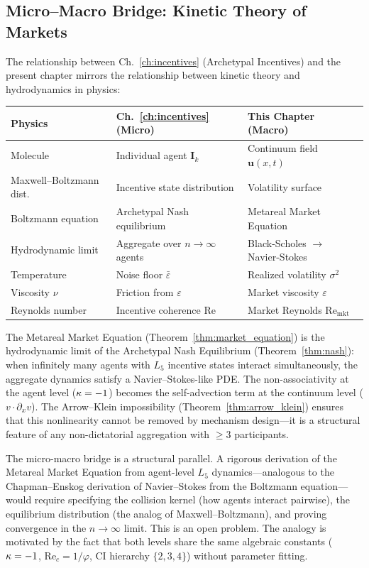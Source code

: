\subsection{Micro--Macro Bridge: Kinetic Theory of Markets}

The relationship between Ch.~\ref{ch:incentives} (Archetypal Incentives) and the present chapter mirrors the relationship between kinetic theory and hydrodynamics in physics:

\begin{center}
\begin{tabular}{@{}lll@{}}
\toprule
\textbf{Physics} & \textbf{Ch.~\ref{ch:incentives} (Micro)} & \textbf{This Chapter (Macro)} \\
\midrule
Molecule & Individual agent $\mathbf{I}_k$ & Continuum field $\mathbf{u}(x,t)$ \\
Maxwell--Boltzmann dist. & Incentive state distribution & Volatility surface \\
Boltzmann equation & Archetypal Nash equilibrium & Metareal Market Equation \\
Hydrodynamic limit & Aggregate over $n \to \infty$ agents & Black-Scholes $\to$ Navier-Stokes \\
Temperature & Noise floor $\bar\varepsilon$ & Realized volatility $\sigma^2$ \\
Viscosity $\nu$ & Friction from $\varepsilon$ & Market viscosity $\varepsilon$ \\
Reynolds number & Incentive coherence $\mathrm{Re}$ & Market Reynolds $\mathrm{Re}_{\mathrm{mkt}}$ \\
\bottomrule
\end{tabular}
\end{center}

The Metareal Market Equation (Theorem~\ref{thm:market_equation}) is the hydrodynamic limit of the Archetypal Nash Equilibrium (Theorem~\ref{thm:nash}): when infinitely many agents with $L_5$ incentive states interact simultaneously, the aggregate dynamics satisfy a Navier--Stokes-like PDE. The non-associativity at the agent level ($\kappa = -1$) becomes the self-advection term at the continuum level ($v \cdot \partial_x v$). The Arrow--Klein impossibility (Theorem~\ref{thm:arrow_klein}) ensures that this nonlinearity cannot be removed by mechanism design---it is a structural feature of any non-dictatorial aggregation with $\geq 3$ participants.

\begin{remark}
The micro-macro bridge is a structural parallel. A rigorous derivation of the Metareal Market Equation from agent-level $L_5$ dynamics---analogous to the Chapman--Enskog derivation of Navier--Stokes from the Boltzmann equation---would require specifying the collision kernel (how agents interact pairwise), the equilibrium distribution (the analog of Maxwell--Boltzmann), and proving convergence in the $n \to \infty$ limit. This is an open problem. The analogy is motivated by the fact that both levels share the same algebraic constants ($\kappa = -1$, $\mathrm{Re}_c = 1/\varphi$, CI hierarchy $\{2,3,4\}$) without parameter fitting.
\end{remark}

